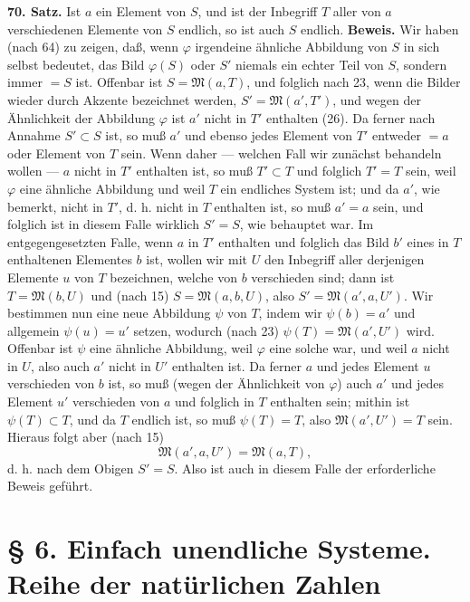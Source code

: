 \documentclass[11pt]{article}
\newcommand{\Mf}{\mathfrak{M}}
\newcommand{\partof}{\mathrel{\subset}}
\begin{document}
\noindent\textbf{70. Satz.} Ist $a$ ein Element von $S$, und ist der Inbegriff $T$ aller von $a$ verschiedenen Elemente von $S$ endlich, so ist auch $S$ endlich. \textbf{Beweis.} Wir haben (nach 64) zu zeigen, daß, wenn $\varphi$ irgendeine ähnliche Abbildung von $S$ in sich selbst bedeutet, das Bild $\varphi(S)$ oder $S'$ niemals ein echter Teil von $S$, sondern immer $=S$ ist. Offenbar ist $S=\Mf(a,T)$, und folglich nach 23, wenn die Bilder wieder durch Akzente bezeichnet werden, $S'=\Mf(a',T')$, und wegen der Ähnlichkeit der Abbildung $\varphi$ ist $a'$ nicht in $T'$ enthalten (26). Da ferner nach Annahme $S'\partof S$ ist, so muß $a'$ und ebenso jedes Element von $T'$ entweder $=a$ oder Element von $T$ sein. Wenn daher — welchen Fall wir zunächst behandeln wollen — $a$ nicht in $T'$ enthalten ist, so muß $T'\partof T$ und folglich $T'=T$ sein, weil $\varphi$ eine ähnliche Abbildung und weil $T$ ein endliches System ist; und da $a'$, wie bemerkt, nicht in $T'$, d. h. nicht in $T$ enthalten ist, so muß $a'=a$ sein, und folglich ist in diesem Falle wirklich $S'=S$, wie behauptet war. Im entgegengesetzten Falle, wenn $a$ in $T'$ enthalten und folglich das Bild $b'$ eines in $T$ enthaltenen Elementes $b$ ist, wollen wir mit $U$ den Inbegriff aller derjenigen Elemente $u$ von $T$ bezeichnen, welche von $b$ verschieden sind; dann ist $T=\Mf(b,U)$ und (nach 15) $S=\Mf(a,b,U)$, also $S'=\Mf(a',a,U')$. Wir bestimmen nun eine neue Abbildung $\psi$ von $T$, indem wir $\psi(b)=a'$ und allgemein $\psi(u)=u'$ setzen, wodurch (nach 23) $\psi(T)=\Mf(a',U')$ wird. Offenbar ist $\psi$ eine ähnliche Abbildung, weil $\varphi$ eine solche war, und weil $a$ nicht in $U$, also auch $a'$ nicht in $U'$ enthalten ist. Da ferner $a$ und jedes Element $u$ verschieden von $b$ ist, so muß (wegen der Ähnlichkeit von $\varphi$) auch $a'$ und jedes Element $u'$ verschieden von $a$ und folglich in $T$ enthalten sein; mithin ist $\psi(T)\partof T$, und da $T$ endlich ist, so muß $\psi(T)=T$, also $\Mf(a',U')=T$ sein. Hieraus folgt aber (nach 15)
\[
\Mf(a',a,U')=\Mf(a,T),
\]
d. h. nach dem Obigen $S'=S$. Also ist auch in diesem Falle der erforderliche Beweis geführt.

\section*{§ 6. Einfach unendliche Systeme. Reihe der natürlichen Zahlen}
\end{document}
